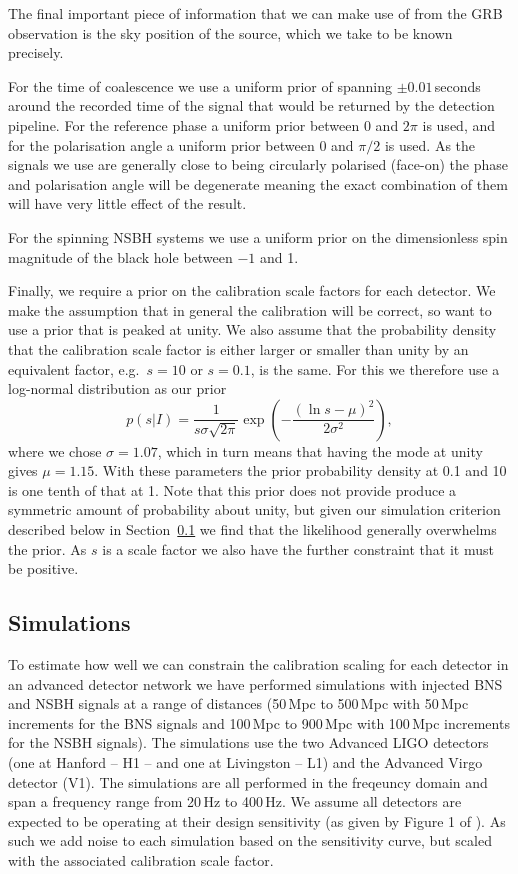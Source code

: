 \documentclass[10pt]{iopart}
\begin{document}
The final important piece of information that we can make use of from the GRB observation is the 
sky position of the source, which we take to be known precisely.

For the time of coalescence we use a uniform prior of spanning $\pm0.01$\,seconds around the 
recorded time of the signal that would be returned by the detection pipeline. For the reference 
phase a uniform prior between 0 and $2\pi$ is used, and for the polarisation angle a uniform prior 
between 0 and $\pi/2$ is used. As the signals we use are generally close to being circularly 
polarised (face-on) the phase and polarisation angle will be degenerate meaning the exact 
combination of them will have very little effect of the result.

For the spinning \ac{NSBH} systems we use a uniform prior on the dimensionless spin magnitude of 
the black hole between $-1$ and 1.

Finally, we require a prior on the calibration scale factors for each detector. We make the 
assumption that in general the calibration will be correct, so want to use a prior that is peaked 
at unity. We also assume that the probability density that the calibration scale factor is either 
larger or smaller than unity by an equivalent factor, e.g.\ $s=10$ or $s=0.1$, is the same. For this 
we therefore use a log-normal distribution as our prior
\begin{equation}
 p(s|I) = \frac{1}{s\sigma\sqrt{2\pi}}\exp{\left( -\frac{(\ln{s} - \mu)^2}{2\sigma^2} \right)},
\end{equation}
where we chose $\sigma = 1.07$, which in turn means that having the mode at unity gives $\mu = 
1.15$. With these parameters the prior probability density at 0.1 and 10 is one tenth of that at 
1. Note that this prior does not provide produce a symmetric amount of probability about unity, but 
given our simulation criterion described below in Section~\ref{sec:simulations} we find that the 
likelihood generally overwhelms the prior. As $s$ is a scale factor we also have the further 
constraint that it must be positive.

\subsection{Simulations}\label{sec:simulations}

To estimate how well we can constrain the calibration scaling for each detector in an advanced 
detector network we have performed simulations with injected \ac{BNS} and \ac{NSBH} signals at a 
range of distances (50\,Mpc to 500\,Mpc with 50\,Mpc increments for the \ac{BNS} signals and 
100\,Mpc to 900\,Mpc with 100\,Mpc increments for the \ac{NSBH} signals). The simulations use the 
two Advanced LIGO detectors (one at Hanford -- H1 -- and one at Livingston -- L1) and the Advanced 
Virgo detector (V1). The simulations are all performed in the freqeuncy domain and span a frequency 
range from 20\,Hz to 400\,Hz. We assume all detectors are expected to be operating at their design
sensitivity (as given by Figure 1 of \cite{2013arXiv1304.0670L}). As such we add noise to each 
simulation based on the sensitivity curve, but scaled with the associated calibration scale factor.
\end{document}
